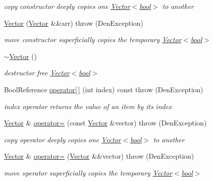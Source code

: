 \begin{DoxyCompactItemize}
\begin{DoxyCompactList}\small\item\em copy constructor  deeply copies one \hyperlink{classVector_3_01bool_01_4}{Vector$<$bool$>$} to another \end{DoxyCompactList}\item 
\hyperlink{classVector_3_01bool_01_4_af834cd016e8f08054b45f911e408397b}{Vector} (\hyperlink{classVector}{Vector} \&\&arr)  throw (\+Den\+Exception)
\begin{DoxyCompactList}\small\item\em move constructor  superficially copies the temporary \hyperlink{classVector_3_01bool_01_4}{Vector$<$bool$>$} \end{DoxyCompactList}\item 
\mbox{\label{classVector_3_01bool_01_4_a9e56319ff8bc77cbdda7c508a680c04c}} 
\hyperlink{classVector_3_01bool_01_4_a9e56319ff8bc77cbdda7c508a680c04c}{$\sim$\+Vector} ()
\begin{DoxyCompactList}\small\item\em destructor  free \hyperlink{classVector_3_01bool_01_4}{Vector$<$bool$>$} \end{DoxyCompactList}\item 
Bool\+Reference \hyperlink{classVector_3_01bool_01_4_a0668d217d484d3486b4b70583b3a6f1f}{operator\mbox{[}$\,$\mbox{]}} (int index) const  throw (\+Den\+Exception)
\begin{DoxyCompactList}\small\item\em index operator  returns the value of an item by its index \end{DoxyCompactList}\item 
\hyperlink{classVector}{Vector} \& \hyperlink{classVector_3_01bool_01_4_ad5616dff05cceca72ddb94463c3be844}{operator=} (const \hyperlink{classVector}{Vector} \&vector)  throw (\+Den\+Exception)
\begin{DoxyCompactList}\small\item\em copy operator  deeply copies one \hyperlink{classVector_3_01bool_01_4}{Vector$<$bool$>$} to another \end{DoxyCompactList}\item 
\hyperlink{classVector}{Vector} \& \hyperlink{classVector_3_01bool_01_4_a025822477d0628b78d8952b6fce63915}{operator=} (\hyperlink{classVector}{Vector} \&\&vector)  throw (\+Den\+Exception)
\begin{DoxyCompactList}\small\item\em move operator  superficially copies the temporary \hyperlink{classVector_3_01bool_01_4}{Vector$<$bool$>$} \end{DoxyCompactList}\item 

\end{DoxyCompactItemize}
